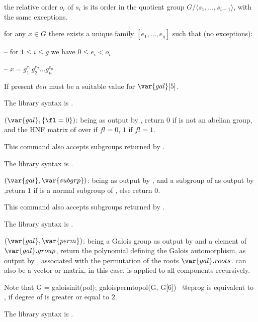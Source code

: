 \quad\item the relative order $o_i$ of $s_i$ is its order in the
quotient group $G/\langle s_1,\ldots,s_{i-1}\rangle$, with the same
exceptions.

\quad\item for any $x\in G$ there exists a unique family
$[e_1,\ldots,e_g]$ such that (no exceptions):

-- for $1\leq i \leq g$ we have $0\leq e_i<o_i$

-- $x=g_1^{e_1}g_2^{e_2}\ldots g_n^{e_n}$

If present $den$ must be a suitable value for $\var{gal}[5]$.

The library syntax is .

$(\var{gal},\{\fl=0\})$: \label{se:galoisisabelian} being as output by , return $0$ if
 is not an abelian group, and the HNF matrix of  over
 if $fl=0$, $1$ if $fl=1$.

This command also accepts subgroups returned by .

The library syntax is .

$(\var{gal},\var{subgrp})$: \label{se:galoisisnormal} being as output by , and  a subgroup
of  as output by ,return $1$ if  is a
normal subgroup of , else return 0.

This command also accepts subgroups returned by .

The library syntax is .

$(\var{gal},\var{perm})$: \label{se:galoispermtopol} being a
Galois group as output by  and  a element of
$\var{gal}.group$, return the polynomial defining the Galois
automorphism, as output by , associated with the
permutation  of the roots $\var{gal}.roots$.  can
also be a vector or matrix, in this case,  is
applied to all components recursively.

\noindent Note that
\bprog
G = galoisinit(pol);
galoispermtopol(G, G[6])~
@eprog\noindent
is equivalent to , if degree of  is greater
or equal to $2$.

The library syntax is .

